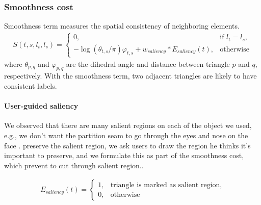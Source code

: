 \subsubsection{Smoothness cost}
Smoothness term measures the spatial consistency of neighboring elements.
\begin{align}
S(t, s, l_t, l_s) = 
\begin{cases}
0, & \text{if } l_t = l_s, \\
-\log(\theta_{t,s}/\pi)\varphi_{t,s} + w_{saliency} * E_{saliency}(t), & \text{otherwise} 
\end{cases}
\end{align}
where $\theta_{p,q}$ and $\varphi_{p,q}$ are the dihedral angle and distance between triangle $p$ and $q$, respectively.
With the smoothness term, two adjacent triangles are likely to have consistent labels.

\paragraph{User-guided saliency} 
We observed that there are many salient regions on each of the object we used, e.g., we don't want the partition seam to go through the eyes and nose on the face .
 preserve the salient region, we ask users to draw the region he thinks it's important to preserve, and we formulate this as part of the smoothness cost, which prevent  to cut through salient region\chireplace{~\figname~\ref{fig:saliency}}{(~\figname~\ref{fig:saliency})}..

\begin{align}
E_{saliency}(t) = 
\begin{cases}
1, & \text{triangle is marked as salient region}, \\
0, & \text{otherwise} 
\end{cases}
\end{align}


